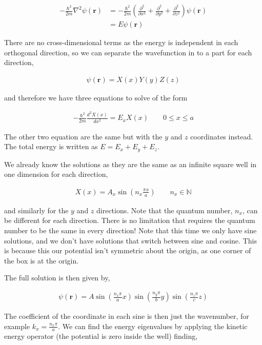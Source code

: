 \documentclass[11pt]{amsart}
\begin{document}
\begin{align*}
  -\frac{\hbar^2}{2m}\nabla^2\psi(\mathbf{r}) &= -\frac{\hbar^2}{2m}\left(\frac{\partial^2}{\partial x^2} + \frac{\partial^2}{\partial y^2} + \frac{\partial^2}{\partial z^2}\right)\psi(\mathbf{r}) \\
                                              &= E\psi(\mathbf{r})
\end{align*}

There are no cross-dimensional terms as the energy is independent in each orthogonal direction, so we can separate the wavefunction in to a part for each direction,

\begin{align*}
  \psi(\mathbf{r})=X(x)Y(y)Z(z)
\end{align*}

and therefore we have three equations to solve of the form

\begin{align*}
  -\frac{\hbar^2}{2m} \frac{d^2 X(x)}{dx^2} = E_x X(x) \qquad 0\leq x\leq a
\end{align*}

The other two equation are the same but with the $y$ and $z$ coordinates instead. The total energy is written as $E=E_x+E_y+E_z$.

We already know the solutions as they are the same as an infinite square well in one dimension for each direction,

\begin{align*}
  X(x) = A_x\sin{\left(n_x\frac{\pi x}{a}\right)} \qquad n_x\in\mathbb{N}
\end{align*}

and similarly for the $y$ and $z$ directions. Note that the quantum number, $n_x$, can be different for each direction. There is no limitation that requires the quantum number to be the same in every direction! Note that this time we only have sine solutions, and we don't have solutions that switch between sine and cosine. This is because this our potential isn't symmetric about the origin, as one corner of the box is at the origin.

The full solution is then given by,

\begin{align*}
  \psi(\mathbf{r}) = A\sin{\left(\frac{n_x \pi}{a} x\right)}\sin{\left(\frac{n_y \pi}{b} y\right)}\sin{\left(\frac{n_z \pi}{c} z\right)}
\end{align*}

The coefficient of the coordinate in each sine is then just the wavenumber, for example $k_x = \frac{n_x \pi}{a}$. We can find the energy eigenvalues by applying the kinetic energy operator (the potential is zero inside the well) finding,
\end{document}

